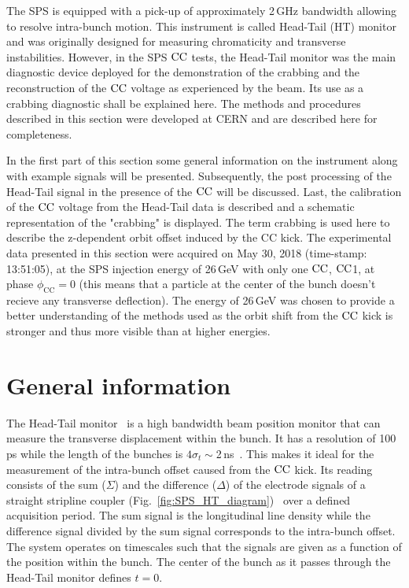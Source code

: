 The SPS is equipped with a pick-up of approximately 2\,GHz bandwidth allowing to resolve intra-bunch motion. This instrument is called Head-Tail (HT) monitor and was originally designed for measuring chromaticity and transverse instabilities. However, in the SPS ${\mathrm{CC}}$ tests, the Head-Tail monitor was the main diagnostic device deployed for the demonstration of the crabbing and the reconstruction of the ${\mathrm{CC}}$ voltage as experienced by the beam. Its use as a crabbing diagnostic shall be explained here. The methods and procedures described in this section were developed at CERN and are described here for completeness.

In the first part of this section some general information on the instrument along with example signals will be presented. Subsequently, the post processing of the Head-Tail signal in the presence of the ${\mathrm{CC}}$ will be discussed. Last, the calibration of the ${\mathrm{CC}}$ voltage from the Head-Tail data is described and a schematic representation of the "crabbing" is displayed. The term crabbing is used here to describe the z-dependent orbit offset induced by the CC kick. The experimental data presented in this section were acquired on May 30, 2018 (time-stamp: 13:51:05), at the SPS injection energy of 26\,GeV with only one ${\mathrm{CC}}$, ${\mathrm{CC}}$1, at phase $\phi_\mathrm{CC}=0$ (this means that a particle at the center of the bunch doesn't recieve any transverse deflection). The energy of 26\,GeV was chosen to provide a better understanding of the methods used as the orbit shift from the ${\mathrm{CC}}$ kick is stronger and thus more visible than at higher energies.

\section{General information}\label{subsec:HT_general_info}
The Head-Tail monitor~\cite{sps_headtail_monitor} is a high bandwidth beam position monitor that can measure the transverse displacement within the bunch. It has a resolution of 100\,ps while the length of the bunches is $4\sigma_t \sim $2\,ns~\cite{Carver:2696108}.  This makes it ideal for the measurement of the intra-bunch offset caused from the ${\mathrm{CC}}$ kick. Its reading consists of the sum ($\Sigma$) and the difference ($\Delta$) of the electrode signals of a straight stripline coupler (Fig.~\ref{fig:SPS_HT_diagram})~\cite{Jones:987561, Levens:2313358} over a defined acquisition period. The sum signal is the longitudinal line density while the difference signal divided by the sum signal corresponds to the intra-bunch offset. The system operates on timescales such that the signals are given as a function of the position within the bunch. The center of the bunch as it passes through the Head-Tail monitor defines $t=0$. 

